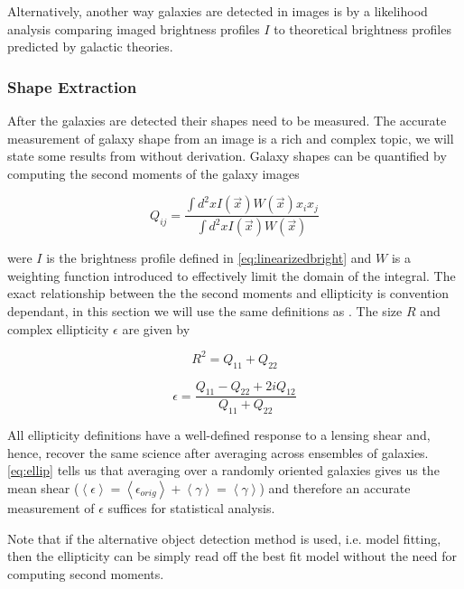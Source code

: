 \par Alternatively, another way galaxies are detected in images is by a likelihood analysis comparing imaged brightness profiles $I$ to theoretical brightness profiles predicted by galactic theories.

\subsubsection{Shape Extraction}
After the galaxies are detected their shapes need to be measured. The accurate measurement of galaxy shape from an image is a rich and complex topic, we will state some results from \cite{massey_2013,general_2013} without derivation. Galaxy shapes can be quantified by computing the second moments of the galaxy images 

\begin{equation}
    Q_{ij} = \frac{\int  d^2x I(\vec{x}) W(\vec{x})x_ix_j}{\int d^2x I(\vec{x}) W(\vec{x}) }
    \label{eq:moments}
\end{equation}


were $I$ is the brightness profile defined in \autoref{eq:linearizedbright} and $W$ is a weighting function introduced to effectively limit the domain of the integral. The exact relationship between the the second moments and ellipticity is convention dependant, in this section we will use the same definitions as \cite{rachel_2018,Hoekstra:2013gua}. The size $R$ and complex ellipticity $\epsilon$ are given by

\begin{equation}
    R^2 = Q_{11} + Q_{22}
    \label{eq:size}
\end{equation}

\begin{equation}
    \epsilon = \frac{Q_{11}-Q_{22}+2iQ_{12}}{Q_{11}+Q_{22}}
    \label{eq:ellipticity}
\end{equation}

All ellipticity definitions have a well-defined response to a lensing shear and, hence, recover the same science after averaging across ensembles of galaxies. \autoref{eq:ellip} tells us that averaging over a randomly oriented galaxies gives us the mean shear ($\left< \epsilon \right > = \left< \epsilon_{orig}\right> + \left<\gamma \right> = \left<\gamma \right>$) and therefore an accurate measurement of $\epsilon$ suffices for statistical analysis. 

\par Note that if the alternative object detection method is used, i.e. model fitting, then the ellipticity can be simply read off the best fit model without the need for computing second moments.

